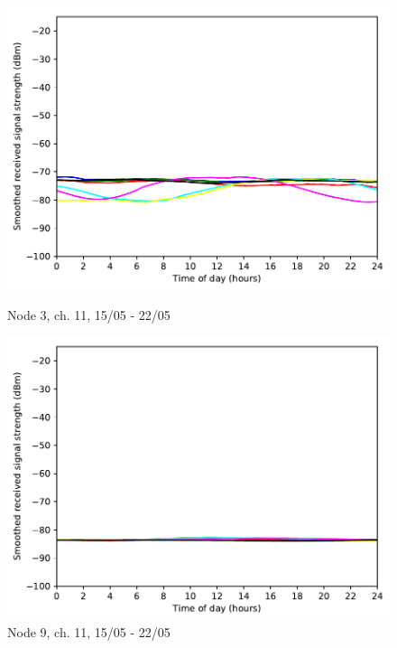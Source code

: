 \documentclass[a4paper, 11pt]{article}
\begin{document}
\begin{figure}[!h]
\begin{minipage}{0.47\textwidth}
    \centering
	\includegraphics[width=\textwidth]{images/2_4_GHz/cot-node3-student_2017-05-21_chan11_image}
    \caption{Node 3, ch. 11, 15/05 - 22/05} \label{node3-11}
\end{minipage}\hfill
\begin{minipage}{0.47\textwidth}
    \centering
	\includegraphics[width=\textwidth]{images/2_4_GHz/cot-node9-student_2017-05-21_chan11_image}
    \caption{Node 9, ch. 11, 15/05 - 22/05} \label{node9-11}
\end{minipage}\hfill
\end{figure}
\end{document}
